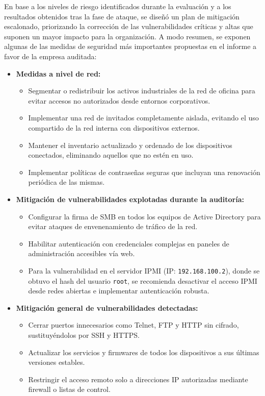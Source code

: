 \documentclass[a4paper, 11pt]{article}
\begin{document}
En base a los niveles de riesgo identificados durante la evaluación y a los resultados obtenidos tras la fase de ataque, se diseñó un plan de mitigación escalonado, priorizando la corrección de las vulnerabilidades críticas y altas que suponen un mayor impacto para la organización. A modo resumen, se exponen algunas de las medidas de seguridad más importantes propuestas en el informe a favor de la empresa auditada:

\begin{itemize}
    \item \textbf{Medidas a nivel de red:}
    \begin{itemize}
        \item Segmentar o redistribuir los activos industriales de la red de oficina para evitar accesos no autorizados desde entornos corporativos.
        \item Implementar una red de invitados completamente aislada, evitando el uso compartido de la red interna con dispositivos externos.
        \item Mantener el inventario actualizado y ordenado de los dispositivos conectados, eliminando aquellos que no estén en uso.
        \item Implementar políticas de contraseñas seguras que incluyan una renovación periódica de las mismas.
    \end{itemize}
    
    \item \textbf{Mitigación de vulnerabilidades explotadas durante la auditoría:}
    \begin{itemize}
        \item Configurar la firma de SMB en todos los equipos de Active Directory para evitar ataques de envenenamiento de tráfico de la red.
        \item Habilitar autenticación con credenciales complejas en paneles de administración accesibles vía web.
        \item Para la vulnerabilidad en el servidor IPMI (IP: \texttt{192.168.100.2}), donde se obtuvo el hash del usuario \texttt{root}, se recomienda desactivar el acceso IPMI desde redes abiertas e implementar autenticación robusta.
    \end{itemize}
    
    \item \textbf{Mitigación general de vulnerabilidades detectadas:}
    \begin{itemize}
        \item Cerrar puertos innecesarios como Telnet, FTP y HTTP sin cifrado, sustituyéndolos por SSH y HTTPS.
        \item Actualizar los servicios y firmwares de todos los dispositivos a sus últimas versiones estables.
        \item Restringir el acceso remoto solo a direcciones IP autorizadas mediante firewall o listas de control.
    \end{itemize}


\end{itemize}
\end{document}
